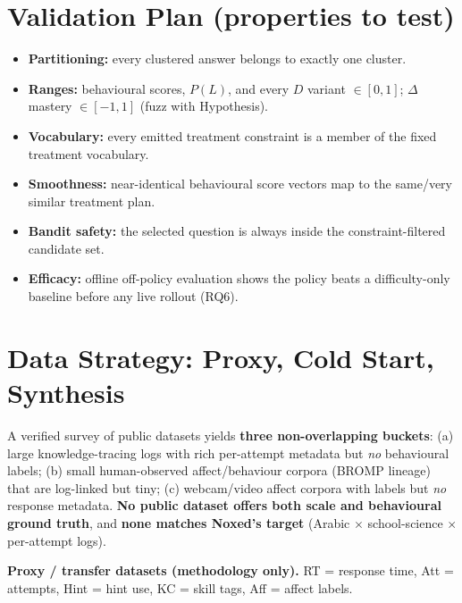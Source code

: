 \documentclass[11pt]{article}
\begin{document}
\section{Validation Plan (properties to test)}
\begin{itemize}
\item \textbf{Partitioning:} every clustered answer belongs to exactly one cluster.
\item \textbf{Ranges:} behavioural scores, $P(L)$, and every $D$ variant $\in[0,1]$; $\Delta$mastery $\in[-1,1]$ (fuzz with Hypothesis).
\item \textbf{Vocabulary:} every emitted treatment constraint is a member of the fixed treatment vocabulary.
\item \textbf{Smoothness:} near-identical behavioural score vectors map to the same/very similar treatment plan.
\item \textbf{Bandit safety:} the selected question is always inside the constraint-filtered candidate set.
\item \textbf{Efficacy:} offline off-policy evaluation shows the policy beats a difficulty-only baseline before any live rollout (RQ6).
\end{itemize}

\section{Data Strategy: Proxy, Cold Start, Synthesis}\label{sec:data}
A verified survey of public datasets yields \textbf{three non-overlapping buckets}: (a) large knowledge-tracing logs with rich per-attempt metadata but \emph{no} behavioural labels; (b) small human-observed affect/behaviour corpora (BROMP lineage) that are log-linked but tiny; (c) webcam/video affect corpora with labels but \emph{no} response metadata. \textbf{No public dataset offers both scale and behavioural ground truth}, and \textbf{none matches Noxed's target} (Arabic $\times$ school-science $\times$ per-attempt logs).

\smallskip
\noindent\textbf{Proxy / transfer datasets (methodology only).} RT = response time, Att = attempts, Hint = hint use, KC = skill tags, Aff = affect labels.
\end{document}
